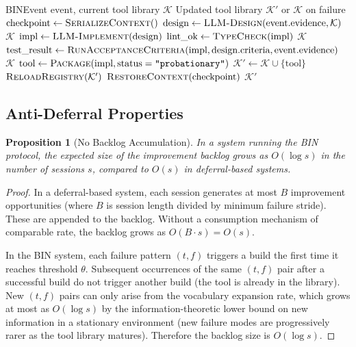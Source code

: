 \documentclass[11pt]{article}
\newtheorem{proposition}[theorem]{Proposition}
\begin{document}
\begin{algorithm}[H]
\caption{BIN-BUILD-PIPELINE$(\text{event}, \mathcal{K})$}
\label{alg:bin_build}
\begin{algorithmic}[1]
\Require BINEvent $\text{event}$, current tool library $\mathcal{K}$
\Ensure Updated tool library $\mathcal{K}'$ or $\mathcal{K}$ on failure
\State $\text{checkpoint} \gets \textsc{SerializeContext}()$
\State $\text{design} \gets \textsc{LLM-Design}(\text{event.evidence}, \mathcal{K})$
    \State \Return $\mathcal{K}$ 
\EndIf
\State $\text{impl} \gets \textsc{LLM-Implement}(\text{design})$
\State $\text{lint\_ok} \gets \textsc{TypeCheck}(\text{impl})$
    \State \Return $\mathcal{K}$
\EndIf
\State $\text{test\_result} \gets \textsc{RunAcceptanceCriteria}(\text{impl}, \text{design.criteria}, \text{event.evidence})$
    \State \Return $\mathcal{K}$
\EndIf
\State $\text{tool} \gets \textsc{Package}(\text{impl}, \text{status}=\texttt{"probationary"})$
\State $\mathcal{K}' \gets \mathcal{K} \cup \{\text{tool}\}$
\State $\textsc{ReloadRegistry}(\mathcal{K}')$
\State $\textsc{RestoreContext}(\text{checkpoint})$
\State \Return $\mathcal{K}'$
\end{algorithmic}
\end{algorithm}

\subsection{Anti-Deferral Properties}

\begin{proposition}[No Backlog Accumulation]
\label{prop:no_backlog}
In a system running the BIN protocol, the expected size of the improvement
backlog grows as $O(\log s)$ in the number of sessions $s$, compared to
$O(s)$ in deferral-based systems.
\end{proposition}

\begin{proof}
In a deferral-based system, each session generates at most $B$ improvement
opportunities (where $B$ is session length divided by minimum failure stride).
These are appended to the backlog. Without a consumption mechanism of comparable
rate, the backlog grows as $O(B \cdot s) = O(s)$.

In the BIN system, each failure pattern $(t, f)$ triggers a build the first
time it reaches threshold $\theta$. Subsequent occurrences of the same
$(t, f)$ pair after a successful build do not trigger another build (the tool
is already in the library). New $(t, f)$ pairs can only arise from the
vocabulary expansion rate, which grows at most as $O(\log s)$ by the
information-theoretic lower bound on new information in a stationary environment
(new failure modes are progressively rarer as the tool library matures).
Therefore the backlog size is $O(\log s)$.
\end{proof}
\end{document}
